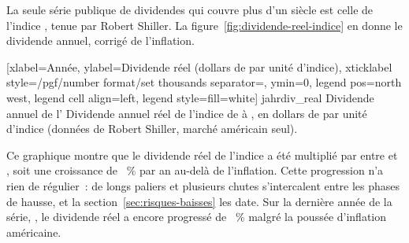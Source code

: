 La seule s\'erie publique de dividendes qui couvre plus d'un si\`ecle est celle de l'indice
\IndiceActionsUs{}, tenue par Robert Shiller. La figure~\ref{fig:dividende-reel-indice} en donne le
dividende annuel, corrig\'e de l'inflation.


[xlabel={Ann\'ee},
  ylabel={Dividende r\'eel (dollars de \ShillerFin{} par unit\'e d'indice)},
  xticklabel style={/pgf/number format/set thousands separator={}}, ymin=0,
  legend pos=north west, legend cell align=left, legend style={fill=white}]%
  {jahr}{div_real}%
  {{Dividende annuel de l'\IndiceActionsUs}}%
  {Dividende annuel r\'eel de l'indice \IndiceActionsUs{} de \ShillerDebut{} \`a \ShillerFin, en
  dollars de \ShillerFin{} par unit\'e d'indice (donn\'ees de Robert Shiller, march\'e am\'ericain
  seul).\label{fig:dividende-reel-indice}}

Ce graphique montre que le dividende r\'eel de l'indice a \'et\'e multipli\'e par \ShillerDivMultiple{}
entre \ShillerDebut{} et \ShillerFin, soit une croissance de \ShillerDivCroissance~\% par an au-del\`a
de l'inflation. Cette progression n'a rien de r\'egulier~: de longs paliers et plusieurs chutes
s'intercalent entre les phases de hausse, et la section~\ref{sec:risques-baisses} les date. Sur la
derni\`ere ann\'ee de la s\'erie, \ShillerFin, le dividende r\'eel a encore progress\'e de
\ShillerDivCroissanceDerniere~\% malgr\'e la pouss\'ee d'inflation am\'ericaine.

